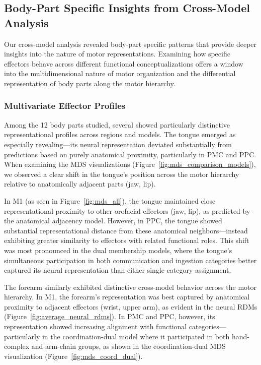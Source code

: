 \documentclass{article}
\begin{document}
\subsection{Body-Part Specific Insights from Cross-Model Analysis}

Our cross-model analysis revealed body-part specific patterns that provide deeper insights into the nature of motor representations. Examining how specific effectors behave across different functional conceptualizations offers a window into the multidimensional nature of motor organization and the differential representation of body parts along the motor hierarchy.

\subsubsection{Multivariate Effector Profiles}

Among the 12 body parts studied, several showed particularly distinctive representational profiles across regions and models. The tongue emerged as especially revealing—its neural representation deviated substantially from predictions based on purely anatomical proximity, particularly in PMC and PPC. When examining the MDS visualizations (Figure~\ref{fig:mds_comparison_models}), we observed a clear shift in the tongue's position across the motor hierarchy relative to anatomically adjacent parts (jaw, lip).

In M1 (as seen in Figure~\ref{fig:mds_all}), the tongue maintained close representational proximity to other orofacial effectors (jaw, lip), as predicted by the anatomical adjacency model. However, in PPC, the tongue showed substantial representational distance from these anatomical neighbors—instead exhibiting greater similarity to effectors with related functional roles. This shift was most pronounced in the dual membership models, where the tongue's simultaneous participation in both communication and ingestion categories better captured its neural representation than either single-category assignment.

The forearm similarly exhibited distinctive cross-model behavior across the motor hierarchy. In M1, the forearm's representation was best captured by anatomical proximity to adjacent effectors (wrist, upper arm), as evident in the neural RDMs (Figure~\ref{fig:average_neural_rdms}). In PMC and PPC, however, its representation showed increasing alignment with functional categories—particularly in the coordination-dual model where it participated in both hand-complex and arm-chain groups, as shown in the coordination-dual MDS visualization (Figure~\ref{fig:mds_coord_dual}).
\end{document}
